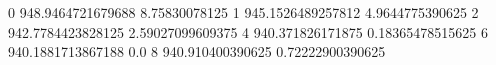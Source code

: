 0 948.9464721679688 8.75830078125
1 945.1526489257812 4.9644775390625
2 942.7784423828125 2.59027099609375
4 940.371826171875 0.18365478515625
6 940.1881713867188 0.0
8 940.910400390625 0.72222900390625
